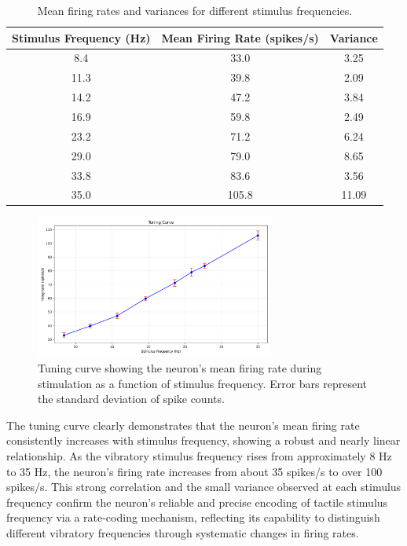 \documentclass{article}
\begin{document}
\begin{table}[H]
\centering
\begin{tabular}{ccc}
\toprule
\textbf{Stimulus Frequency (Hz)} & \textbf{Mean Firing Rate (spikes/s)} & \textbf{Variance} \\
\midrule
8.4 & 33.0 & 3.25 \\
11.3 & 39.8 & 2.09 \\
14.2 & 47.2 & 3.84 \\
16.9 & 59.8 & 2.49 \\
23.2 & 71.2 & 6.24 \\
29.0 & 79.0 & 8.65 \\
33.8 & 83.6 & 3.56 \\
35.0 & 105.8 & 11.09 \\
\bottomrule
\end{tabular}
\caption{Mean firing rates and variances for different stimulus frequencies.}
\label{tab:tuning_data}
\end{table}

\begin{figure}[H]
\centering
\includegraphics[width=0.7\textwidth]{Fig8.png}
\caption{Tuning curve showing the neuron's mean firing rate during stimulation as a function of stimulus frequency. Error bars represent the standard deviation of spike counts.}
\label{fig:tuning_curve}
\end{figure}

The tuning curve clearly demonstrates that the neuron's mean firing rate consistently increases with stimulus frequency, showing a robust and nearly linear relationship. As the vibratory stimulus frequency rises from approximately 8 Hz to 35 Hz, the neuron's firing rate increases from about 35 spikes/s to over 100 spikes/s. This strong correlation and the small variance observed at each stimulus frequency confirm the neuron’s reliable and precise encoding of tactile stimulus frequency via a rate-coding mechanism, reflecting its capability to distinguish different vibratory frequencies through systematic changes in firing rates.
\end{document}
